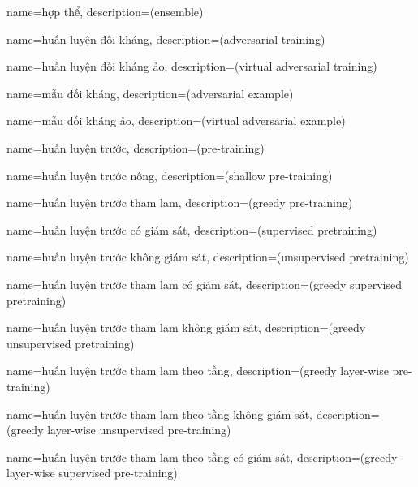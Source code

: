 {
    name={hợp thể},
    description={(ensemble)}
}

{
    name={huấn luyện đối kháng},
    description={(adversarial training)}
}

{
    name={huấn luyện đối kháng ảo},
    description={(virtual adversarial training)}
}

{
    name={mẫu đối kháng},
    description={(adversarial example)}
}

{
    name={mẫu đối kháng ảo},
    description={(virtual adversarial example)}
}

{
    name={huấn luyện trước},
    description={(pre-training)}
}

{
    name={huấn luyện trước nông},
    description={(shallow pre-training)}
}

{
    name={huấn luyện trước tham lam},
    description={(greedy pre-training)}
}

{
    name={huấn luyện trước có giám sát},
    description={(supervised pretraining)}
}

{
    name={huấn luyện trước không giám sát},
    description={(unsupervised pretraining)}
}

{
    name={huấn luyện trước tham lam có giám sát},
    description={(greedy supervised pretraining)}
}

{
    name={huấn luyện trước tham lam không giám sát},
    description={(greedy unsupervised pretraining)}
}

{
    name={huấn luyện trước tham lam theo tầng},
    description={(greedy layer-wise pre-training)}
}

{
    name={huấn luyện trước tham lam theo tầng không giám sát},
    description={(greedy layer-wise unsupervised pre-training)}
}

{
    name={huấn luyện trước tham lam theo tầng có giám sát},
    description={(greedy layer-wise supervised pre-training)}
}

